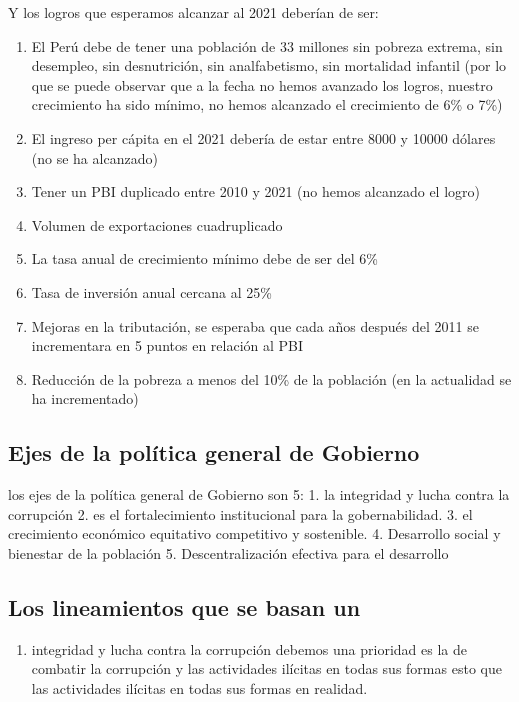 \documentclass[
  jou,
  floatsintext,
  longtable,
  a4paper,
  nolmodern,
  notxfonts,
  notimes,
  12pt,
  colorlinks=true,linkcolor=blue,citecolor=blue,urlcolor=blue]{apa7}
\providecommand{\tightlist}{%
  \setlength{\itemsep}{0pt}\setlength{\parskip}{0pt}}
\begin{document}
Y los logros que esperamos alcanzar al 2021 deberían de ser:

\begin{enumerate}
\def\labelenumi{\arabic{enumi}.}
\tightlist
\item
  El Perú debe de tener una población de 33 millones sin pobreza
  extrema, sin desempleo, sin desnutrición, sin analfabetismo, sin
  mortalidad infantil (por lo que se puede observar que a la fecha no
  hemos avanzado los logros, nuestro crecimiento ha sido mínimo, no
  hemos alcanzado el crecimiento de 6\% o 7\%)
\item
  El ingreso per cápita en el 2021 debería de estar entre 8000 y 10000
  dólares (no se ha alcanzado)
\item
  Tener un PBI duplicado entre 2010 y 2021 (no hemos alcanzado el logro)
\item
  Volumen de exportaciones cuadruplicado
\item
  La tasa anual de crecimiento mínimo debe de ser del 6\%
\item
  Tasa de inversión anual cercana al 25\%
\item
  Mejoras en la tributación, se esperaba que cada años después del 2011
  se incrementara en 5 puntos en relación al PBI
\item
  Reducción de la pobreza a menos del 10\% de la población (en la
  actualidad se ha incrementado)
\end{enumerate}

\subsection{Ejes de la política general de
Gobierno}\label{ejes-de-la-poluxedtica-general-de-gobierno}

los ejes de la política general de Gobierno son 5: 1. la integridad y
lucha contra la corrupción 2. es el fortalecimiento institucional para
la gobernabilidad. 3. el crecimiento económico equitativo competitivo y
sostenible. 4. Desarrollo social y bienestar de la población 5.
Descentralización efectiva para el desarrollo

\subsection{Los lineamientos que se basan
un}\label{los-lineamientos-que-se-basan-un}

\begin{enumerate}
\def\labelenumi{\arabic{enumi}.}
\tightlist
\item
  integridad y lucha contra la corrupción debemos una prioridad es la de
  combatir la corrupción y las actividades ilícitas en todas sus formas
  esto que las actividades ilícitas en todas sus formas en realidad.
\end{enumerate}
\end{document}

